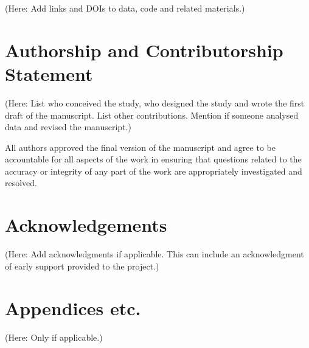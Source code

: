 \documentclass{ldr-article}
\begin{document}
(Here: Add links and DOIs to data, code and related materials.)

\section{Authorship and Contributorship Statement}

(Here: List who conceived the study, who designed the study and wrote the first draft of the manuscript. List other contributions. Mention if someone analysed data and revised the manuscript.)

All authors approved the final version of the manuscript and agree to be accountable for all aspects of the work in ensuring that questions related to the accuracy or integrity of any part of the work are appropriately investigated and resolved.

\section{Acknowledgements}

(Here: Add acknowledgments if applicable. This can include an acknowledgment of early support provided to the project.)

\clearpage
\appendix

\section{Appendices etc.}

(Here: Only if applicable.)
\end{document}
